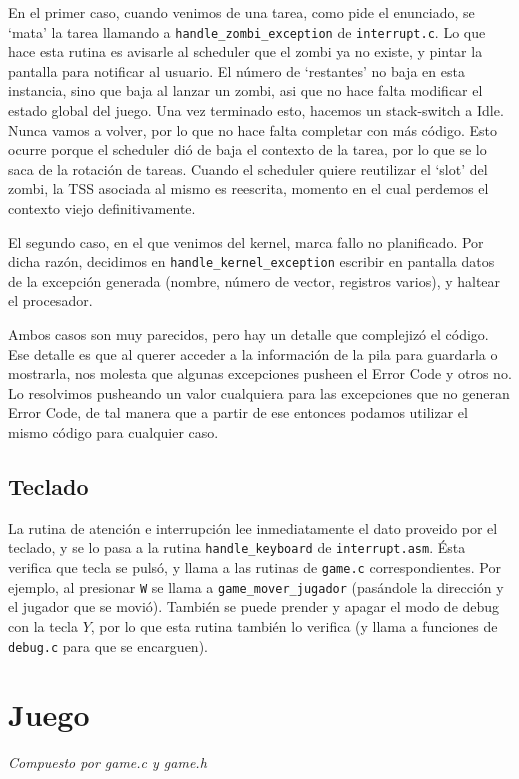 \documentclass{article}
\begin{document}
	En el primer caso, cuando venimos de una tarea, como pide el enunciado, se `mata' la tarea llamando a \texttt{handle\_zombi\_exception} de \texttt{interrupt.c}. Lo que hace esta rutina es avisarle al scheduler que el zombi ya no existe, y pintar la pantalla para notificar al usuario. El número de `restantes' no baja en esta instancia, sino que baja al lanzar un zombi, asi que no hace falta modificar el estado global del juego. Una vez terminado esto, hacemos un stack-switch a Idle. Nunca vamos a volver, por lo que no hace falta completar con más código. Esto ocurre porque el scheduler dió de baja el contexto de la tarea, por lo que se lo saca de la rotación de tareas. Cuando el scheduler quiere reutilizar el `slot' del zombi, la TSS asociada al mismo es reescrita, momento en el cual perdemos el contexto viejo definitivamente.
	
	El segundo caso, en el que venimos del kernel, marca fallo no planificado. Por dicha razón, decidimos en \texttt{handle\_kernel\_exception} escribir en pantalla datos de la excepción generada (nombre, número de vector, registros varios), y haltear el procesador.

	Ambos casos son muy parecidos, pero hay un detalle que complejizó el código. Ese detalle es que al querer acceder a  la información de la pila para guardarla o mostrarla, nos molesta que algunas excepciones pusheen el Error Code y otros no. Lo resolvimos pusheando un valor cualquiera para las excepciones que no generan Error Code, de tal manera que a partir de ese entonces podamos utilizar el mismo código para cualquier caso.
	
	\subsection*{Teclado}
	
	La rutina de atención e interrupción lee inmediatamente el dato proveido por el teclado, y se lo pasa a la rutina \texttt{handle\_keyboard} de \texttt{interrupt.asm}. Ésta verifica que tecla se pulsó, y llama a las rutinas de \texttt{game.c} correspondientes. Por ejemplo, al presionar \texttt{W} se llama a \texttt{game\_mover\_jugador} (pasándole la dirección y el jugador que se movió). También se puede prender y apagar el modo de debug con la tecla $Y$, por lo que esta rutina también lo verifica (y llama a funciones de \texttt{debug.c} para que se encarguen).

	
	\section{Juego}
	\vspace{-1cm}	
	\begin{flushright}
	\textit{Compuesto por game.c y game.h}
	\end{flushright}
	
\end{document}
